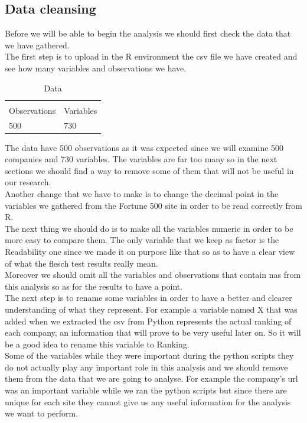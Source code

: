 \documentclass{book}
\begin{document}
\subsection{Data cleansing}
Before we will be able to begin the analysis we should first check the data that we have gathered.\\
The first step is to upload in the R environment the csv file we have created and see how many variables and observations we have.
\begin{table}[H]
\centering
\caption{Data}
\begin{tabular}{ll}
  & \\
Observations & Variables \\
500 & 730 \\
\end{tabular}
\end{table}
The data have 500 observations as it was expected since we will examine 500 companies and 730 variables. The variables are far too many so in the next sections we should find a way to remove some of them that will not be useful in our research.\\
Another change that we have to make is to change the decimal point in the variables we gathered from the Fortune 500 site in order to be read correctly from R.\\
The next thing we should do is to make all the variables numeric in order to be more easy to compare them. The only variable that we keep as factor is the Readability one since we made it on purpose like that so as to have a clear view of what the flesch test results really mean.\\
Moreover we should omit all the variables and observations that contain nas from this analysis so as for the results to have a point.\\
The next step is to rename some variables in order to have a better and clearer understanding of what they represent. For example a variable named X that was added when we extracted the csv from Python represents the actual ranking of each company, an information that will prove to be very useful later on. So it will be a good idea to rename this variable to Ranking.\\
Some of the variables while they were important during the python scripts they do not actually play any important role in this analysis and we should remove them from the data that we are going to analyse. For example the company's url was an important variable while we ran the python scripts but since there are unique for each site they cannot give us any useful information for the analysis we want to perform.\\
\end{document}
